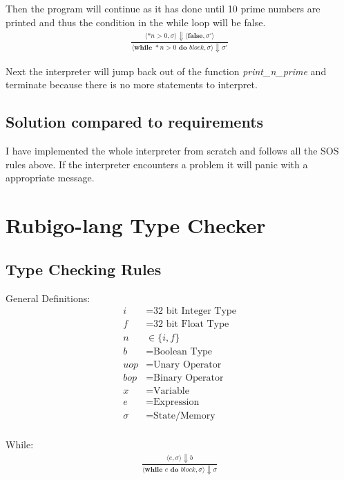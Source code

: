 \documentclass[12pt]{article}
\begin{document}
	Then the program will continue as it has done until 10 prime numbers are printed and thus the condition in the while loop will be false.
	\begin{align*}
		\frac{\langle *n > 0, \sigma \rangle\Downarrow \langle \textbf{false}, \sigma' \rangle}
		{\langle \textbf{while } *n > 0 \textbf{ do } block, \sigma \rangle\Downarrow \sigma'}
	\end{align*}

	Next the interpreter will jump back out of the function \emph{print\_n\_prime} and terminate because there is no more statements to interpret.



    \subsection{Solution compared to requirements}
	I have implemented the whole interpreter from scratch and follows all the SOS rules above. If the interpreter encounters a problem it will panic with a appropriate message. 



    \section{Rubigo-lang Type Checker}	
    	\subsection{Type Checking Rules}
	General Definitions:
    	\begin{align*}
		i &= \text{32 bit Integer Type} \\
		f &= \text{32 bit Float Type} \\
		n &\in \{i, f\} \\
		b &= \text{Boolean Type} \\
		uop &= \text{Unary Operator} \\
		bop &= \text{Binary Operator} \\
		x &= \text{Variable} \\
		e &= \text{Expression} \\
		\sigma &= \text{State/Memory} \\
	\end{align*}

	While:
	\begin{align*}
		\frac{\langle e, \sigma \rangle\Downarrow b}
		{\langle \textbf{while } e \textbf{ do } block, \sigma \rangle\Downarrow \sigma}
	\end{align*}
\end{document}
